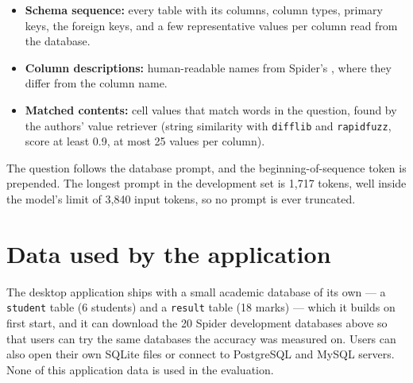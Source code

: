 \begin{itemize}
	\item \textbf{Schema sequence:} every table with its columns, column types, primary keys, the foreign keys, and a few representative values per column read from the database.
	\item \textbf{Column descriptions:} human-readable names from Spider's , where they differ from the column name.
	\item \textbf{Matched contents:} cell values that match words in the question, found by the authors' value retriever (string similarity with \texttt{difflib} and \texttt{rapidfuzz}, score at least 0.9, at most 25 values per column).
\end{itemize}

The question follows the database prompt, and the beginning-of-sequence token is prepended. The longest prompt in the development set is 1,717 tokens, well inside the model's limit of 3,840 input tokens, so no prompt is ever truncated.

\section{Data used by the application}

The desktop application ships with a small academic database of its own --- a \texttt{student} table (6 students) and a \texttt{result} table (18 marks) --- which it builds on first start, and it can download the 20 Spider development databases above so that users can try the same databases the accuracy was measured on. Users can also open their own SQLite files or connect to PostgreSQL and MySQL servers. None of this application data is used in the evaluation.
